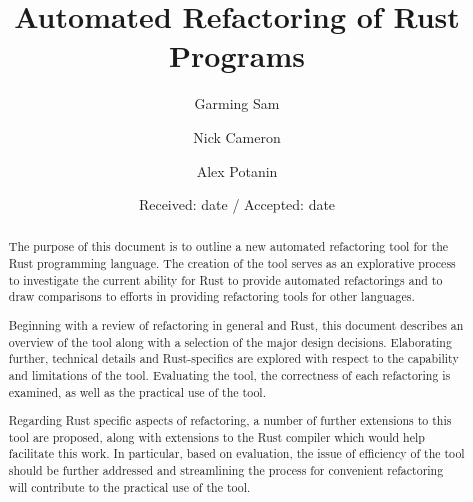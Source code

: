 \documentclass[smallextended]{svjour3}       %
\begin{document}
\title{Automated Refactoring of Rust Programs%
}
\subtitle{}%


\author{Garming Sam \and Nick Cameron \and Alex Potanin}



\date{Received: date / Accepted: date}

\maketitle

\begin{abstract}
The purpose of this document is to outline a new automated refactoring tool for the Rust programming language. The creation of the tool serves as an explorative process to investigate the current ability for Rust to provide automated refactorings and to draw comparisons to  efforts in providing refactoring tools for other languages. 

Beginning with a review of refactoring in general and Rust, this document describes an overview of the tool along with a selection of the major design decisions. Elaborating further, technical details and Rust-specifics are explored with respect to the capability and limitations of the tool. Evaluating the tool, the correctness of each refactoring is examined, as well as the practical use of the tool.

Regarding Rust specific aspects of refactoring, a number of further extensions to this tool are proposed, along with extensions to the Rust compiler which would help facilitate this work. In particular, based on evaluation, the issue of efficiency of the tool should be further addressed and streamlining the process for convenient refactoring will contribute to the practical use of the tool.
\end{abstract}
\end{document}
